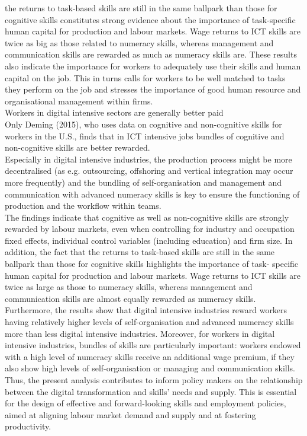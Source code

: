 the returns to task-based skills are still in the same ballpark than those for cognitive skills constitutes strong evidence about the importance of task-specific human capital for production and labour markets. Wage returns to ICT skills are twice as big as those related to numeracy skills, whereas management and communication skills are rewarded as much as numeracy skills are. These results also indicate the importance for workers to adequately use their skills and human capital on the job. This in turns calls for workers to be well matched to tasks they perform on the job and stresses the importance of good human resource and organisational management within firms.\\

Workers in digital intensive sectors are generally better paid\\

Only Deming (2015), who uses data on cognitive and non-cognitive skills for workers in the U.S., finds that in ICT intensive jobs bundles of cognitive and non-cognitive skills are better rewarded.\\

Especially in digital intensive industries, the production process might be more decentralised (as e.g. outsourcing, offshoring and vertical integration may occur more frequently) and the bundling of self-organisation and management and communication with advanced numeracy skills is key to ensure the functioning of production and the workflow within teams.\\

The findings indicate that cognitive as well as non-cognitive skills are strongly rewarded by labour markets, even when controlling for industry and occupation fixed effects, individual control variables (including education) and firm size. In addition, the fact that the returns to task-based skills are still in the same ballpark than those for cognitive skills highlights the importance of task- specific human capital for production and labour markets. Wage returns to ICT skills are twice as large as those to numeracy skills, whereas management and communication skills are almost equally rewarded as numeracy skills.\\

Furthermore, the results show that digital intensive industries reward workers having relatively higher levels of self-organisation and advanced numeracy skills more than less digital intensive industries. Moreover, for workers in digital intensive industries, bundles of skills are particularly important: workers endowed with a high level of numeracy skills receive an additional wage premium, if they also show high levels of self-organisation or managing and communication skills. Thus, the present analysis contributes to inform policy makers on the relationship between the digital transformation and skills’ needs and supply. This is essential for the design of effective and forward-looking skills and employment policies, aimed at aligning labour market demand and supply and at fostering productivity.\\

